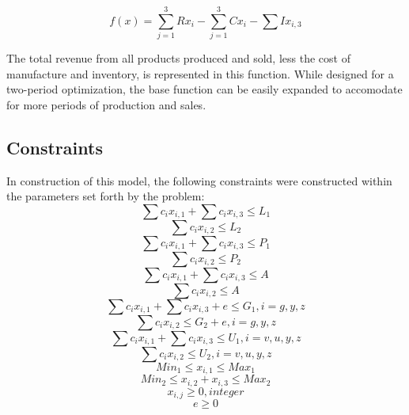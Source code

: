 \documentclass{article}
\begin{document}
$$f(x) = \sum_{j=1}^{3}Rx_{i} - \sum_{j=1}^{3}Cx_{i} - \sum Ix_{i,3} $$

The total revenue from all products produced and sold, less the cost of manufacture and inventory, is represented in this function.  While designed for a two-period optimization, the base function can be easily expanded to accomodate for more periods of production and sales.
\subsection{Constraints}
In construction of this model, the following constraints were constructed within the parameters set forth by the problem:
\begin{equation}
\sum c_{i}x_{i,1} + \sum c_{i}x_{i,3} \leq L_{1} %
\end{equation}
\begin{equation}
\sum c_{i}x_{i,2} \leq L_{2} %
\end{equation}
\begin{equation}
\sum c_{i}x_{i,1} + \sum c_{i}x_{i,3} \leq P_{1} %
\end{equation}
\begin{equation}
\sum c_{i}x_{i,2} \leq P_{2}%
\end{equation}
\begin{equation}
\sum c_{i}x_{i,1} + \sum c_{i}x_{i,3} \leq A %
\end{equation}
\begin{equation}
\sum c_{i}x_{i,2} \leq A %
\end{equation}
\begin{equation}
\sum c_{i}x_{i,1} + \sum c_{i}x_{i,3} + e \leq G_{1},  i = g, y, z %
\end{equation}
\begin{equation}
\sum c_{i}x_{i,2} \leq G_{2} + e, i = g, y, z %
\end{equation}
\begin{equation}
\sum c_{i}x_{i,1} + \sum c_{i}x_{i,3} \leq U_{1} , i = v, u, y, z %
\end{equation}
\begin{equation}
\sum c_{i}x_{i,2} \leq U_{2},  i = v, u, y, z %
\end{equation}
\begin{equation}
Min_{1} \leq x_{i,1} \leq Max_{1} %
\end{equation}
\begin{equation}
Min_{2} \leq x_{i,2} + x_{i,3} \leq Max_{2}
\end{equation}
\begin{equation}
x_{i,j} \geq 0, integer %
\end{equation}
\begin{equation}
e \geq 0
\end{equation}
\end{document}
